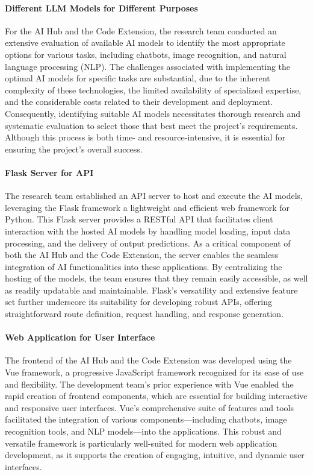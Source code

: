 \paragraph{Different LLM Models for Different Purposes}

For the AI Hub and the Code Extension, the research team conducted an extensive evaluation of available AI models to identify the most appropriate options for various tasks, including chatbots, image recognition, and natural language processing (NLP). The challenges associated with implementing the optimal AI models for specific tasks are substantial, due to the inherent complexity of these technologies, the limited availability of specialized expertise, and the considerable costs related to their development and deployment. Consequently, identifying suitable AI models necessitates thorough research and systematic evaluation to select those that best meet the project’s requirements. Although this process is both time- and resource-intensive, it is essential for ensuring the project’s overall success.

\paragraph{Flask Server for API}

The research team established an API server to host and execute the AI models, leveraging the Flask framework a lightweight and efficient web framework for Python. This Flask server provides a RESTful API that facilitates client interaction with the hosted AI models by handling model loading, input data processing, and the delivery of output predictions. As a critical component of both the AI Hub and the Code Extension, the server enables the seamless integration of AI functionalities into these applications. By centralizing the hosting of the models, the team ensures that they remain easily accessible, as well as readily updatable and maintainable. Flask’s versatility and extensive feature set further underscore its suitability for developing robust APIs, offering straightforward route definition, request handling, and response generation.

\paragraph{Web Application for User Interface}

The frontend of the AI Hub and the Code Extension was developed using the Vue framework, a progressive JavaScript framework recognized for its ease of use and flexibility. The development team’s prior experience with Vue enabled the rapid creation of frontend components, which are essential for building interactive and responsive user interfaces. Vue’s comprehensive suite of features and tools facilitated the integration of various components—including chatbots, image recognition tools, and NLP models—into the applications. This robust and versatile framework is particularly well-suited for modern web application development, as it supports the creation of engaging, intuitive, and dynamic user interfaces.


